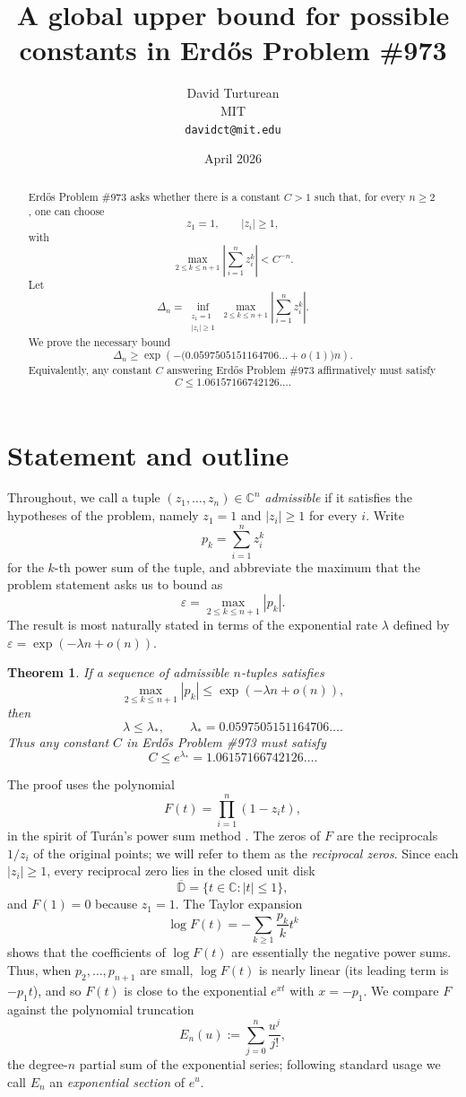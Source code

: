 \documentclass[11pt]{article}
\title{A global upper bound for possible constants in Erd\H{o}s Problem \#973}
\author{David Turturean \\ \small MIT \\ \small \texttt{davidct@mit.edu}}
\date{April 2026}
\newtheorem{theorem}{Theorem}
\newcommand{\C}{\mathbb{C}}
\newcommand{\eps}{\varepsilon}
\begin{document}
\maketitle

\begin{abstract}
Erd\H{o}s Problem \#973 \cite{Bloom973} asks whether there is a constant
$C>1$ such that, for every $n\geq2$, one can choose
\[
        z_1=1,\qquad |z_i|\geq1,
\]
with
\[
        \max_{2\leq k\leq n+1}\left|\sum_{i=1}^n z_i^k\right|<C^{-n}.
\]
Let
\[
        \Delta_n=\inf_{\substack{z_1=1\\ |z_i|\geq1}}
        \max_{2\leq k\leq n+1}\left|\sum_{i=1}^n z_i^k\right|.
\]
We prove the necessary bound
\[
        \Delta_n\geq
        \exp\!\left(-\bigl(0.0597505151164706\ldots+o(1)\bigr)n\right).
\]
Equivalently, any constant $C$ answering Erd\H{o}s Problem \#973
affirmatively must satisfy
\[
        C\leq 1.06157166742126\ldots .
\]
\end{abstract}

\section{Statement and outline}

Throughout, we call a tuple $(z_1,\ldots,z_n)\in\C^n$ \emph{admissible} if
it satisfies the hypotheses of the problem, namely $z_1=1$ and $|z_i|\geq 1$
for every $i$.  Write
\[
        p_k=\sum_{i=1}^n z_i^k
\]
for the $k$-th power sum of the tuple, and abbreviate the maximum that the
problem statement asks us to bound as
\[
        \eps=\max_{2\leq k\leq n+1}|p_k|.
\]
The result is most naturally stated in terms of the exponential rate
$\lambda$ defined by $\eps=\exp(-\lambda n+o(n))$.

\begin{theorem}\label{thm:global}
If a sequence of admissible $n$-tuples satisfies
\[
        \max_{2\leq k\leq n+1}|p_k|
        \leq \exp(-\lambda n+o(n)),
\]
then
\[
        \lambda\leq \lambda_*,
        \qquad
        \lambda_*=0.0597505151164706\ldots .
\]
Thus any constant $C$ in Erd\H{o}s Problem \#973 must satisfy
\[
        C\leq e^{\lambda_*}=1.06157166742126\ldots .
\]
\end{theorem}

The proof uses the polynomial
\[
        F(t)=\prod_{i=1}^n(1-z_it),
\]
in the spirit of Tur\'an's power sum method \cite{Turan}.
The zeros of $F$ are the reciprocals $1/z_i$ of the original points; we
will refer to them as the \emph{reciprocal zeros}.  Since each
$|z_i|\geq 1$, every reciprocal zero lies in the closed unit disk
\[
        \overline{\mathbb D}=\{t\in\C:|t|\leq 1\},
\]
and $F(1)=0$ because $z_1=1$.  The Taylor expansion
\[
        \log F(t)=-\sum_{k\geq1}\frac{p_k}{k}t^k
\]
shows that the coefficients of $\log F(t)$ are essentially the negative
power sums.  Thus, when $p_2,\ldots,p_{n+1}$ are small, $\log F(t)$ is
nearly linear (its leading term is $-p_1 t$), and so $F(t)$ is close to
the exponential $e^{xt}$ with $x=-p_1$.  We compare $F$ against the
polynomial truncation
\[
        E_n(u):=\sum_{j=0}^n\frac{u^j}{j!},
\]
the degree-$n$ partial sum of the exponential series; following standard
usage we call $E_n$ an \emph{exponential section} of $e^u$.
\end{document}
